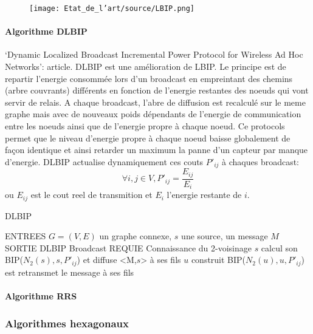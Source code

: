 \begin{figure}[H]
\centering
\texttt{[image: Etat\_de\_l'art/source/LBIP.png]}
\caption{ }
\end{figure} 


\paragraph{Algorithme DLBIP}
`Dynamic Localized Broadcast Incremental Power Protocol for Wireless Ad Hoc Networks': article\cite{Champ2009DLBIP}.
DLBIP est une amélioration de LBIP. Le principe est de repartir l'energie consommée lors d'un broadcast en empreintant des chemins (arbre couvrants) différents en fonction de l'energie restantes des noeuds qui vont servir de relais.
A chaque broadcast, l'abre de diffusion est recalculé sur le meme graphe mais avec de nouveaux poids dépendants de l'energie de communication entre les noeuds ainsi que de l'energie propre à chaque noeud. Ce protocols permet que
le niveau d'energie propre à chaque noeud baisse globalement de façon identique et ainsi retarder un maximum la panne d'un capteur par manque d'energie.
DLBIP actualise dynamiquement ces couts $P'_{ij}$ à chaques broadcast:
$$ \forall i,j \in V, P'_{ij}=\frac{E_{ij}}{E_i}$$
ou $E_{ij}$ est le cout reel de transmition et $E_i$ l'energie restante de $i$.


\begin{algorithm}[h]
\caption{DLBIP}
\label{algo_DLBIP}
\begin{algorithmic}
\STATE ENTREES  $G=(V,E)$ un graphe connexe, $s$ une source, un message $M$
\STATE SORTIE  DLBIP Broadcast
\STATE REQUIE  Connaissance du 2-voisinage
\STATE $s$ calcul son BIP($N_2(s),s,P'_{ij}$) et diffuse <M,$s$> à ses fils
		\STATE $u$ construit BIP($N_2(u),u,P'_{ij}$) est retransmet le message à ses fils
	\ENDIF
\ENDIF
\end{algorithmic}
\end{algorithm}



\paragraph{Algorithme RRS}
\cite{Cartigny2003RNG}


\subsubsection{Algorithmes hexagonaux}


